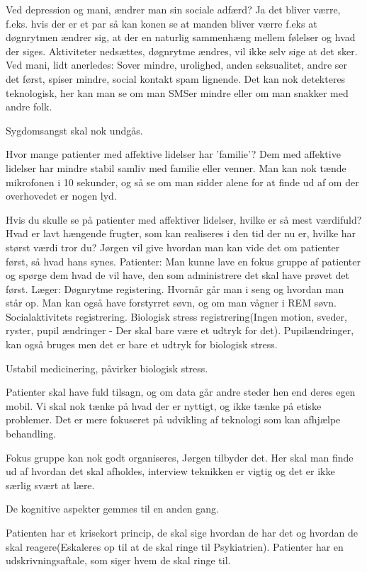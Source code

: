 Ved depression og mani, ændrer man sin sociale adfærd? Ja det bliver værre, f.eks. hvis der er et par så kan konen se at manden bliver værre f.eks at døgnrytmen ændrer sig, at der en naturlig sammenhæng mellem følelser og hvad der siges. Aktiviteter nedsættes, døgnrytme ændres, vil ikke selv sige at det sker. Ved mani, lidt anerledes: Sover mindre, urolighed, anden seksualitet, andre ser det først, spiser mindre, social kontakt spam lignende. Det kan nok detekteres teknologisk, her kan man se om man SMSer mindre eller om man snakker med andre folk. 

Sygdomsangst skal nok undgås. 

Hvor mange patienter med affektive lidelser har 'familie'? Dem med affektive lidelser har mindre stabil samliv med familie eller venner. 
Man kan nok tænde mikrofonen i 10 sekunder, og så se om man sidder alene for at finde ud af om der overhovedet er nogen lyd.

Hvis du skulle se på patienter med affektiver lidelser, hvilke er så mest værdifuld? Hvad er lavt hængende frugter, som kan realiseres i den tid der nu er, hvilke har størst værdi tror du? Jørgen vil give hvordan man kan vide det om patienter først, så hvad hans synes.
Patienter: Man kunne lave en fokus gruppe af patienter og spørge dem hvad de vil have, den som administrere det skal have prøvet det først.
Læger: Døgnrytme registering. Hvornår går man i seng og hvordan man står op. Man kan også have forstyrret søvn, og om man vågner i REM søvn.
Socialaktivitets registrering.
Biologisk stress registrering(Ingen motion, sveder, ryster, pupil ændringer - Der skal bare være et udtryk for det). Pupilændringer, kan også bruges men det er bare et udtryk for biologisk stress.

Ustabil medicinering, påvirker biologisk stress. 

Patienter skal have fuld tilsagn, og om data går andre steder hen end deres egen mobil. Vi skal nok tænke på hvad der er nyttigt, og ikke tænke på etiske problemer. Det er mere fokuseret på udvikling af teknologi som kan afhjælpe behandling.

Fokus gruppe kan nok godt organiseres, Jørgen tilbyder det. Her skal man finde ud af hvordan det skal afholdes, interview teknikken er vigtig og det er ikke særlig svært at lære.

De kognitive aspekter gemmes til en anden gang. 

Patienten har et krisekort princip, de skal sige hvordan de har det og hvordan de skal reagere(Eskaleres op til at de skal ringe til Psykiatrien). Patienter har en udskrivningsaftale, som siger hvem de skal ringe til. 

